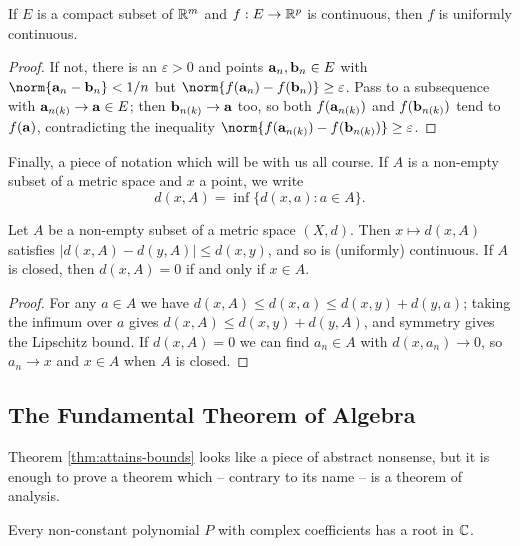 \documentclass[a4paper]{scrartcl}
\begin{document}
\begin{theorem}\label{thm:unif-cts}
	If $E$ is a compact subset of $\mathbb{R}^m$ and $f : E \to \mathbb{R}^p$ is continuous, then $f$ is uniformly continuous.
\end{theorem}

\begin{proof}
	If not, there is an $\varepsilon > 0$ and points $\mathbf{a}_n, \mathbf{b}_n \in E$ with $\norm{\vv{a}_n - \vv{b}_n} < 1/n$ but $\norm{f(\vv{a}_n)-f(\vv{b}_n)} \geq \varepsilon$. Pass to a subsequence with $\mathbf{a}_{n(k)} \to \mathbf{a} \in E$; then $\mathbf{b}_{n(k)} \to \mathbf{a}$ too, so both $f(\mathbf{a}_{n(k)})$ and $f(\mathbf{b}_{n(k)})$ tend to $f(\mathbf{a})$, contradicting the inequality $\norm{f(\vv{a}_{n(k)})-f(\vv{b}_{n(k)})} \geq \varepsilon$.
\end{proof}

Finally, a piece of notation which will be with us all course. If $A$ is a non-empty subset of a metric space and $x$ a point, we write
$$d(x,A) = \inf\{d(x,a) : a \in A\}.$$

\begin{lemma}\label{lem:dist-cts}
	Let $A$ be a non-empty subset of a metric space $(X,d)$. Then $x \mapsto d(x,A)$ satisfies $|d(x,A)-d(y,A)| \leq d(x,y)$, and so is (uniformly) continuous. If $A$ is closed, then $d(x,A) = 0$ if and only if $x \in A$.
\end{lemma}

\begin{proof}
	For any $a \in A$ we have $d(x,A) \leq d(x,a) \leq d(x,y)+d(y,a)$; taking the infimum over $a$ gives $d(x,A) \leq d(x,y) + d(y,A)$, and symmetry gives the Lipschitz bound. If $d(x,A)=0$ we can find $a_n \in A$ with $d(x,a_n) \to 0$, so $a_n \to x$ and $x \in A$ when $A$ is closed.
\end{proof}

\subsection{The Fundamental Theorem of Algebra}

Theorem \ref{thm:attains-bounds} looks like a piece of abstract nonsense, but it is enough to prove a theorem which -- contrary to its name -- is a theorem of analysis.

\begin{theorem}\label{thm:fta}
	Every non-constant polynomial $P$ with complex coefficients has a root in $\mathbb{C}$.
\end{theorem}
\end{document}
